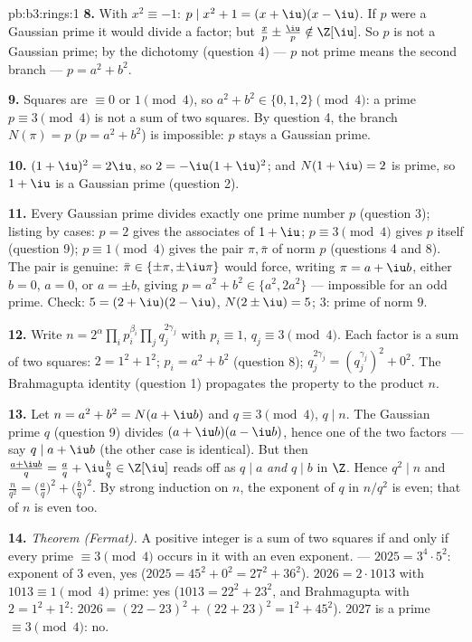 \begin{solution}{pb:b3:rings:1}
\textbf{8.} With $x^2 \equiv -1$: $p \mid x^2 + 1 = (x + \iu)(x -
\iu)$. If $p$ were a Gaussian prime it would divide a factor; but
$\frac xp \pm \frac \iu p \notin \Z[\iu]$. So $p$ is not a
Gaussian prime; by the dichotomy (question 4) --- $p$ not prime
means the second branch --- $p = a^2 + b^2$.

\textbf{9.} Squares are $\equiv 0$ or $1 \pmod 4$, so $a^2 + b^2
\in \{0, 1, 2\} \pmod 4$: a prime $p \equiv 3 \pmod 4$ is not a
sum of two squares. By question 4, the branch $N(\pi) = p$ ($p =
a^2+b^2$) is impossible: $p$ stays a Gaussian prime.

\textbf{10.} $(1 + \iu)^2 = 2\iu$, so $2 = -\iu(1 + \iu)^2$; and
$N(1 + \iu) = 2$ is prime, so $1 + \iu$ is a Gaussian prime
(question 2).

\textbf{11.} Every Gaussian prime divides exactly one prime
number $p$ (question 3); listing by cases: $p = 2$ gives the
associates of $1 + \iu$; $p \equiv 3 \pmod 4$ gives $p$ itself
(question 9); $p \equiv 1 \pmod 4$ gives the pair $\pi, \bar\pi$
of norm $p$ (questions 4 and 8). The pair is genuine: $\bar\pi \in
\{\pm\pi, \pm\iu\pi\}$ would force, writing $\pi = a + \iu b$,
either $b = 0$, $a = 0$, or $a = \pm b$, giving $p = a^2 + b^2 \in
\{a^2, 2a^2\}$ --- impossible for an odd prime. Check:
$5 = (2 + \iu)(2 - \iu)$, $N(2\pm\iu) = 5$; $3$: prime of norm
$9$.

\textbf{12.} Write $n = 2^{\alpha}\prod_i p_i^{\beta_i} \prod_j
q_j^{2\gamma_j}$ with $p_i \equiv 1$, $q_j \equiv 3 \pmod 4$.
Each factor is a sum of two squares: $2 = 1^2 + 1^2$; $p_i = a^2
+ b^2$ (question 8); $q_j^{2\gamma_j} = (q_j^{\gamma_j})^2 +
0^2$. The Brahmagupta identity (question 1) propagates the
property to the product $n$.

\textbf{13.} Let $n = a^2 + b^2 = N(a + \iu b)$ and $q \equiv 3
\pmod 4$, $q \mid n$. The Gaussian prime $q$ (question 9) divides
$(a + \iu b)(a - \iu b)$, hence one of the two factors --- say $q
\mid a + \iu b$ (the other case is identical). But then $\frac{a +
\iu b}{q} = \frac aq + \iu \frac bq \in \Z[\iu]$ reads off as $q
\mid a$ \emph{and} $q \mid b$ in $\Z$. Hence $q^2 \mid n$ and
$\frac n{q^2} =
\bigl(\frac aq\bigr)^2 + \bigl(\frac bq\bigr)^2$. By strong
induction on $n$, the exponent of $q$ in $n/q^2$ is even; that of
$n$ is even too.

\textbf{14.} \emph{Theorem (Fermat).} A positive integer is a sum
of two squares if and only if every prime $\equiv 3 \pmod 4$
occurs in it with an even exponent. --- $2025 = 3^4 \cdot 5^2$:
exponent of $3$ even, yes ($2025 = 45^2 + 0^2 = 27^2 + 36^2$).
$2026 = 2 \cdot 1013$ with $1013 \equiv 1 \pmod 4$ prime: yes
($1013 = 22^2 + 23^2$, and Brahmagupta with $2 = 1^2+1^2$:
$2026 = (22 - 23)^2 + (22 + 23)^2 = 1^2 + 45^2$). $2027$ is a
prime $\equiv 3 \pmod 4$: no.


\end{solution}
